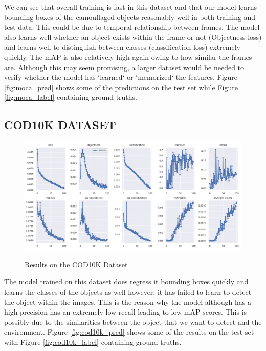 \documentclass[conference]{IEEEtran}
\begin{document}
We can see that overall training is fast in this dataset and that our model learns bounding boxes of the camouflaged objects reasonably well in both training and test data. This could be due to temporal relationship between frames. The model also learns well whether an object exists within the frame or not (Objectness loss) and learns well to distinguish between classes (classification loss) extremely quickly. The mAP is also relatively high again owing to how similar the frames are. Although this may seem promising, a larger dataset would be needed to verify whether the model has `learned` or `memorized` the features. Figure \ref{fig:moca_pred} shows some of the predictions on the test set while Figure \ref{fig:moca_label} containing ground truths. 
\subsection{COD10K DATASET}
\begin{figure}[h]
    \centering
    \includegraphics[width=0.9\linewidth]{Experiments/COD10K/results.png}\\
    \caption{Results on the COD10K Dataset}
    \label{fig10}
\end{figure}
The model trained on this dataset does regress it bounding boxes quickly and learns the classes of the objects as well however, it has failed to learn to detect the object within the images. This is the reason why the model although has a high precision has an extremely low recall leading to low mAP scores. This is possibly due to the similarities between the object that we want to detect and the environment. Figure \ref{fig:cod10k_pred} shows some of the results on the test set with Figure \ref{fig:cod10k_label} containing ground truths.
\end{document}
